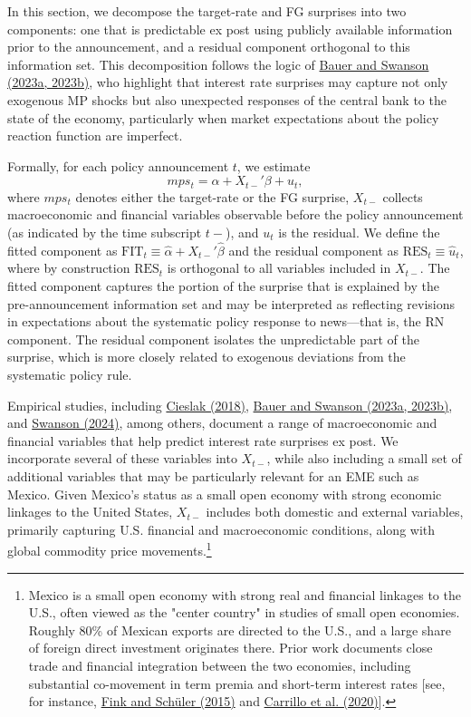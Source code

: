 \documentclass[\latexroot/\projectname]{subfiles}
\begin{document}
In this section, we decompose the target-rate and FG surprises into two components: one that is predictable ex post using publicly available information prior to the announcement, and a residual component orthogonal to this information set. This decomposition follows the logic of \hyperlink{Bauer and Swanson (2023a, 2023b)}{Bauer and Swanson (2023a, 2023b)}, who highlight that interest rate surprises may capture not only exogenous MP shocks but also unexpected responses of the central bank to the state of the economy, particularly when market expectations about the policy reaction function are imperfect.


Formally, for each policy announcement $t$, we estimate
\begin{equation}
mps_t = \alpha + X_{t-}'\beta + u_t,
\end{equation}
where $mps_t$ denotes either the target-rate or the FG surprise, $X_{t-}$ collects macroeconomic and financial variables observable before the policy announcement (as indicated by the time subscript $t-$), and $u_t$ is the residual. We define the fitted component as $\text{FIT}_t \equiv \widehat{\alpha} + X_{t-}'\widehat{\beta}$ and the residual component as $\text{RES}_t \equiv \widehat{u}_t$, where by construction $\text{RES}_t$ is orthogonal to all variables included in $X_{t-}$. The fitted component captures the portion of the surprise that is explained by the pre-announcement information set and may be interpreted as reflecting revisions in expectations about the systematic policy response to news—that is, the RN component. The residual component isolates the unpredictable part of the surprise, which is more closely related to exogenous deviations from the systematic policy rule.

Empirical studies, including  \hyperlink{Cieslak (2018)}{Cieslak (2018)}, \hyperlink{Bauer and Swanson (2023a, 2023b)}{Bauer and Swanson (2023a, 2023b)}, and \hyperlink{Swanson (2024)}{Swanson (2024)}, among others, document a range of macroeconomic and financial variables that help predict interest rate surprises ex post. We incorporate several of these variables into $X_{t-}$, while also including a small set of additional variables that may be particularly relevant for an EME such as Mexico. Given Mexico's status as a small open economy with strong economic linkages to the United States, $X_{t-}$ includes both domestic and external variables, primarily capturing U.S. financial and macroeconomic conditions, along with global commodity price movements.\footnote{Mexico is a small open economy with strong real and financial linkages to the U.S., often viewed as the "center country" in studies of small open economies. Roughly 80\% of Mexican exports are directed to the U.S., and a large share of foreign direct investment originates there. Prior work documents close trade and financial integration between the two economies, including substantial co-movement in term premia and short-term interest rates [see, for instance, \hyperlink{Fink (2015)}{Fink and Schüler (2015)} and \hyperlink{Carrillo et al. (2020)}{Carrillo et al. (2020)}].}
\end{document}
